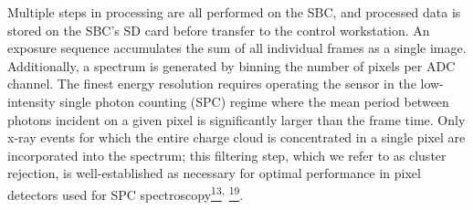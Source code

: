 \FloatBarrier

Multiple steps in processing are all performed on the SBC, and processed
data is stored on the SBC's SD card before transfer to the control
workstation. An exposure sequence accumulates the sum of all individual
frames as a single image. Additionally, a spectrum is generated by
binning the number of pixels per ADC channel. The finest energy
resolution requires operating the sensor in the low-intensity single
photon counting (SPC) regime where the mean period between photons
incident on a given pixel is significantly larger than the frame time.
Only x-ray events for which the entire charge cloud is concentrated in a
single pixel are incorporated into the spectrum; this filtering step,
which we refer to as cluster rejection, is well-established as necessary
for optimal performance in pixel detectors used for SPC
spectroscopy\hyperref[ux5fENREFux5f13]{\textsuperscript{13}}\textsuperscript{,}
\hyperref[ux5fENREFux5f19]{\textsuperscript{19}}.

